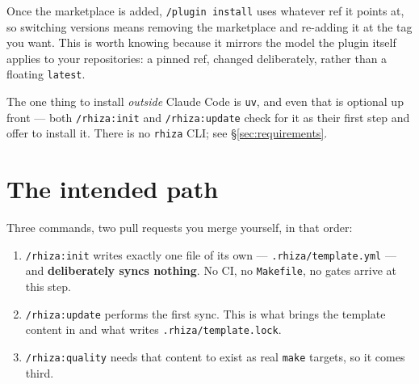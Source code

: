 \documentclass[11pt,a4paper]{article}
\newcommand{\cmd}[1]{\texttt{/rhiza:#1}}
\newcommand{\file}[1]{\texttt{#1}}
\begin{document}
\noindent
Once the marketplace is added, \texttt{/plugin install} uses whatever ref it points at,
so switching versions means removing the marketplace and re-adding it at the tag you
want. This is worth knowing because it mirrors the model the plugin itself applies to
your repositories: a pinned ref, changed deliberately, rather than a floating
\texttt{latest}.

\medskip
\noindent
The one thing to install \emph{outside} Claude Code is \texttt{uv}, and even that is
optional up front --- both \cmd{init} and \cmd{update} check for it as their first step
and offer to install it. There is no \texttt{rhiza} CLI; see
\S\ref{sec:requirements}.

\section{The intended path}

\begin{center}
\end{center}

Three commands, two pull requests you merge yourself, in that order:

\begin{enumerate}[leftmargin=1.4em, itemsep=0.35em]
  \item \cmd{init} writes exactly one file of its own --- \file{.rhiza/template.yml} ---
        and \textbf{deliberately syncs nothing}. No CI, no \file{Makefile}, no gates
        arrive at this step.
  \item \cmd{update} performs the first sync. This is what brings the template content
        in and what writes \file{.rhiza/template.lock}.
  \item \cmd{quality} needs that content to exist as real \texttt{make} targets, so it
        comes third.
\end{enumerate}
\end{document}
